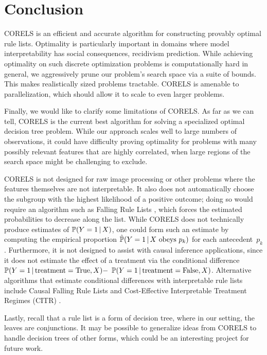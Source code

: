 \section{Conclusion}

CORELS is an efficient and accurate algorithm for constructing provably optimal rule lists.
%
Optimality is particularly important in domains where model interpretability
has social consequences, \eg recidivism prediction.
%
While achieving optimality on such discrete optimization problems is
computationally hard in general, we aggressively prune our problem's search space
via a suite of bounds.
%
This makes realistically sized problems tractable.
%
CORELS is amenable to parallelization, which should allow it to scale to
even larger problems.

\begin{arxiv}
Finally, we would like to clarify some limitations of CORELS.
%
As far as we can tell, CORELS is the current best algorithm for solving a
specialized optimal decision tree problem.
%
While our approach scales well to large numbers of observations,
it could have difficulty proving optimality
for problems with many possibly relevant features that are highly correlated,
when large regions of the search space might be challenging to exclude.

CORELS is not designed for raw image processing or other problems where the features
themselves are not interpretable.
%
It also does not automatically choose the subgroup with the highest likelihood of a
positive outcome; doing so would require an algorithm such as Falling Rule Lists \citep{WangRu15},
which forces the estimated probabilities to decrease along the list.
%
While CORELS does not technically produce estimates of ${\mathbb{P}(Y=1 \,|\, X)}$,
one could form such an estimate by computing the empirical
proportion ${\hat{\mathbb{P}}(Y=1 \,|\, X \textrm{ obeys } p_k)}$ for each antecedent~$p_k$.
%
Furthermore, it is not designed to assist with causal inference applications, since
it does not estimate the effect of a treatment via the conditional difference
${\mathbb{P}(Y=1 \,|\, \textrm{treatment} = \textrm{True}, X) -}$ ${\mathbb{P}(Y=1 \,|\, \textrm{treatment} = \textrm{False}, X)}$.
%
Alternative algorithms that estimate conditional differences with interpretable
rule lists include Causal Falling Rule Lists \citep{WangRu16}
and Cost-Effective Interpretable Treatment Regimes (CITR) \citep{LakkarajuRu17}.

Lastly, recall that a rule list is a form of decision tree,
where in our setting, the leaves are conjunctions.
%
It may be possible to generalize ideas from CORELS to handle decision trees of
other forms, which could be an interesting project for future work.
\end{arxiv}
